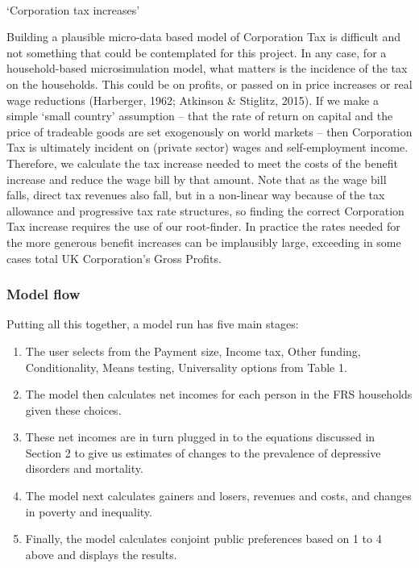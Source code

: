 \documentclass[
  letterpaper,
  DIV=11,
  numbers=noendperiod]{scrartcl}
\makeatletter
\let\oldparagraph\paragraph
\renewcommand{\paragraph}{
    \@ifstar
      \xxxParagraphStar
      \xxxParagraphNoStar
  }
\newcommand{\xxxParagraphStar}[1]{\oldparagraph*{#1}\mbox{}}
\newcommand{\xxxParagraphNoStar}[1]{\oldparagraph{#1}\mbox{}}
\providecommand{\tightlist}{%
  \setlength{\itemsep}{0pt}\setlength{\parskip}{0pt}}\usepackage{longtable,booktabs,array}
\makeatother
\begin{document}
\paragraph{`Corporation tax increases'}\label{corporation-tax-increases}

Building a plausible micro-data based model of Corporation Tax is
difficult and not something that could be contemplated for this project.
In any case, for a household-based microsimulation model, what matters
is the incidence of the tax on the households. This could be on profits,
or passed on in price increases or real wage reductions (Harberger,
1962; Atkinson \& Stiglitz, 2015). If we make a simple `small country'
assumption -- that the rate of return on capital and the price of
tradeable goods are set exogenously on world markets -- then Corporation
Tax is ultimately incident on (private sector) wages and self-employment
income. Therefore, we calculate the tax increase needed to meet the
costs of the benefit increase and reduce the wage bill by that amount.
Note that as the wage bill falls, direct tax revenues also fall, but in
a non-linear way because of the tax allowance and progressive tax rate
structures, so finding the correct Corporation Tax increase requires the
use of our root-finder. In practice the rates needed for the more
generous benefit increases can be implausibly large, exceeding in some
cases total UK Corporation's Gross Profits.

\subsubsection{Model flow}\label{model-flow}

Putting all this together, a model run has five main stages:

\begin{enumerate}
\def\labelenumi{\arabic{enumi}.}
\tightlist
\item
  The user selects from the Payment size, Income tax, Other funding,
  Conditionality, Means testing, Universality options from Table 1.
\item
  The model then calculates net incomes for each person in the FRS
  households given these choices.
\item
  These net incomes are in turn plugged in to the equations discussed in
  Section 2 to give us estimates of changes to the prevalence of
  depressive disorders and mortality.
\item
  The model next calculates gainers and losers, revenues and costs, and
  changes in poverty and inequality.
\item
  Finally, the model calculates conjoint public preferences based on 1
  to 4 above and displays the results.
\end{enumerate}
\end{document}
